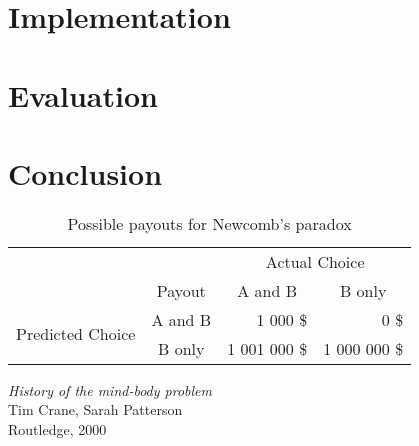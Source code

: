 \documentclass[a4paper]{article}
\begin{document}
	\section{Implementation}

	\section{Evaluation}

	\section{Conclusion}

		\begin{table}[htbp]
			\centering
			\begin{tabular}{c|c|r|r|}
				\multicolumn{1}{c}{} & \multicolumn{1}{c}{} & \multicolumn{2}{c}{Actual Choice} \\
				\cline{2-4}
				& Payout & \multicolumn{1}{|c|}{A and B} & \multicolumn{1}{|c|}{B only} \\
				\cline{2-4}
				\multirow{2}{*}{Predicted Choice} & A and B & 1 000 \$ & 0 \$ \\
				\cline{2-4}
				& B only & 1 001 000 \$ & 1 000 000 \$ \\
				\cline{2-4}
			\end{tabular}
			\caption{Possible payouts for Newcomb's paradox}
			\label{table:NewcombParadoxPayouts}
		\end{table}

	\begin{thebibliography}{}

			\emph{History of the mind-body problem}\\
			Tim Crane, Sarah Patterson\\
			Routledge, 2000

	\end{thebibliography}
\end{document}
